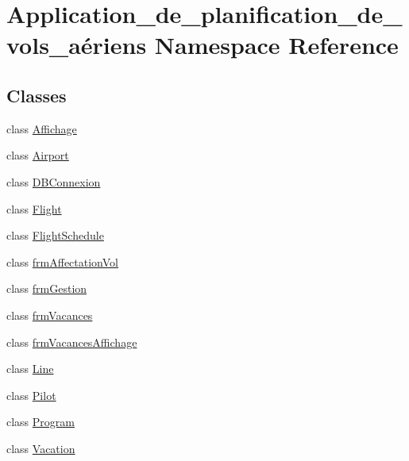 \hypertarget{namespace_application__de__planification__de__vols__a_xC3_xA9riens}{}\section{Application\+\_\+de\+\_\+planification\+\_\+de\+\_\+vols\+\_\+aériens Namespace Reference}
\label{namespace_application__de__planification__de__vols__a_xC3_xA9riens}
\subsection*{Classes}
\begin{DoxyCompactItemize}
\item 
class \hyperlink{class_application__de__planification__de__vols__a_xC3_xA9riens_1_1_affichage}{Affichage}
\item 
class \hyperlink{class_application__de__planification__de__vols__a_xC3_xA9riens_1_1_airport}{Airport}
\item 
class \hyperlink{class_application__de__planification__de__vols__a_xC3_xA9riens_1_1_d_b_connexion}{D\+B\+Connexion}
\item 
class \hyperlink{class_application__de__planification__de__vols__a_xC3_xA9riens_1_1_flight}{Flight}
\item 
class \hyperlink{class_application__de__planification__de__vols__a_xC3_xA9riens_1_1_flight_schedule}{Flight\+Schedule}
\item 
class \hyperlink{class_application__de__planification__de__vols__a_xC3_xA9riens_1_1frm_affectation_vol}{frm\+Affectation\+Vol}
\item 
class \hyperlink{class_application__de__planification__de__vols__a_xC3_xA9riens_1_1frm_gestion}{frm\+Gestion}
\item 
class \hyperlink{class_application__de__planification__de__vols__a_xC3_xA9riens_1_1frm_vacances}{frm\+Vacances}
\item 
class \hyperlink{class_application__de__planification__de__vols__a_xC3_xA9riens_1_1frm_vacances_affichage}{frm\+Vacances\+Affichage}
\item 
class \hyperlink{class_application__de__planification__de__vols__a_xC3_xA9riens_1_1_line}{Line}
\item 
class \hyperlink{class_application__de__planification__de__vols__a_xC3_xA9riens_1_1_pilot}{Pilot}
\item 
class \hyperlink{class_application__de__planification__de__vols__a_xC3_xA9riens_1_1_program}{Program}
\item 
class \hyperlink{class_application__de__planification__de__vols__a_xC3_xA9riens_1_1_vacation}{Vacation}
\end{DoxyCompactItemize}
